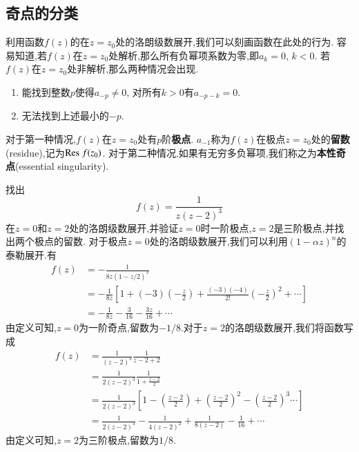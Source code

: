 \subsection{奇点的分类}
\label{subsec:singular_points}
利用函数$f(z)$的在$z=z_0$处的洛朗级数展开,我们可以刻画函数在此处的行为.
容易知道,若$f(z)$在$z=z_0$处解析,那么所有负幂项系数为零,即$a_k = 0$, $k<0$.
若$f(z)$在$z=z_0$处非解析,那么两种情况会出现.
\begin{enumerate}
    \item 能找到整数$p$使得$a_{-p} \neq 0$, 对所有$k>0$有$a_{-p - k}=0$.
    \item 无法找到上述最小的$-p$.
\end{enumerate}
对于第一种情况,$f(z)$在$z=z_0$处有$p$阶\textbf{极点}. $a_{-1}$称为$f(z)$在极点$z=z_0$处的\textbf{留数}(residue),记为${\mathrm{Res}\;} f(z_0)$.
对于第二种情况,如果有无穷多负幂项,我们称之为\textbf{本性奇点}(essential singularity).

\begin{examplebox}{找出\[f(z) = \frac{1}{z( z- 2)^3}\]
    在$z=0$和$z=2$处的洛朗级数展开,并验证$z=0$时一阶极点,$z=2$是三阶极点,并找出两个极点的留数.}
对于极点$z=0$处的洛朗级数展开,我们可以利用$(1-\alpha z)^n$的泰勒展开.有
\[
    \begin{aligned}
    f(z) &= -\frac{1}{8z(1-z/2)^3}
    \\
     &= -\frac{1}{8z}\left[ 1 + (-3) (-\frac{z}{2}) + \frac{(-3)(-4)}{2!} \left( -\frac{z}{2}\right)^2 + \cdots \right] 
    \\
     &= -\frac{1}{8z} - \frac{3}{16} - \frac{3z}{16} + \cdots   
    \end{aligned}
\]
由定义可知,$z=0$为一阶奇点,留数为$-1/8$.对于$z=2$的洛朗级数展开,我们将函数写成
\[
    \begin{aligned}
        f(z) &= \frac{1}{(z-2)^3} \frac{1}{z-2 + 2}
        \\
        &= \frac{1}{2(z-2)^3} \frac{1}{1+\frac{z-2}{2}}
        \\
        &= \frac{1}{2(z-2)^3} \left[ 1 - \left(\frac{z-2}{2} \right) + \left(\frac{z-2}{2}\right)^2 - \left(\frac{z-2}{2}\right)^3 \cdots \right] 
        \\
        &= \frac{1}{2(z-2)^3} - \frac{1}{4(z-2)^2} + \frac{1}{8(z-2)} - \frac{1}{16} + \cdots
    \end{aligned}
\]
由定义可知,$z=2$为三阶极点,留数为$1/8$.
\end{examplebox}

